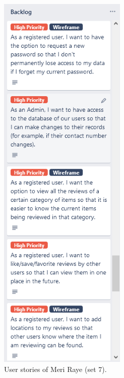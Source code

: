 \documentclass[11pt]{extarticle}
\begin{document}
\begin{center}
    \begin{figure}[H]
        \centering
        \includegraphics[width=2.4in]{Figures/user_stories_7.png}
        \caption{User stories of Meri Raye (set 7).}
    \end{figure}
\end{center}
\end{document}
